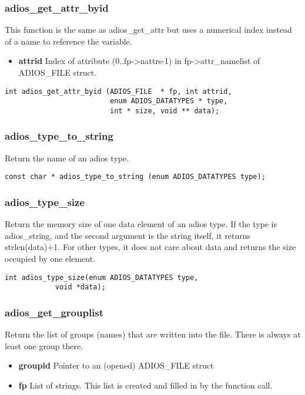 \subsubsection*{adios\_get\_attr\_byid}
This function is the same as adios\_get\_attr but uses a numerical index instead of a name to reference the variable. 
\begin{itemize}
\item{\bf attrid} Index of attribute (0..fp->nattrs-1) in fp->attr\_namelist of ADIOS\_FILE struct. 
\end{itemize}
\begin{lstlisting}[language=ADIOS]
int adios_get_attr_byid (ADIOS_FILE  * fp, int attrid, 
                         enum ADIOS_DATATYPES * type,
                         int * size, void ** data);
\end{lstlisting}

\subsubsection*{adios\_type\_to\_string}
 Return the name of an adios type. 

\begin{lstlisting}[language=ADIOS]
const char * adios_type_to_string (enum ADIOS_DATATYPES type);
\end{lstlisting}

\subsubsection*{adios\_type\_size}
Return the memory size of one data element of an adios type.
If the type is adios\_string, and the second argument is
the string itself, it returns strlen(data)+1. 
For other types, it does not care about data and returns
the size occupied by one element.

\begin{lstlisting}[language=ADIOS]
int adios_type_size(enum ADIOS_DATATYPES type, 
			void *data);
\end{lstlisting}

\subsubsection*{adios\_get\_grouplist}
Return the list of groups (names) that are written into
the file. There is always at least one group there.

\begin{itemize}
\item{\bf groupid} Pointer to an (opened) ADIOS\_FILE struct
\item{\bf fp} List of strings. This list is created and filled in by the function call. 
\end{itemize}

